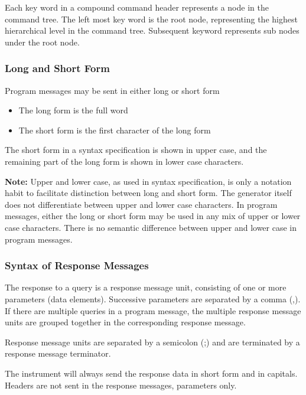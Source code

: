 Each key word in a compound command header represents a node in the command tree. The left most key word is the root node, representing the highest hierarchical level in the command tree. Subsequent keyword represents sub nodes under the root node.

\subsubsection{Long and Short Form}

Program messages may be sent in either long or short form
\begin{itemize}
\item The long form is the full word
\item The short form is the first character of the long form
\end{itemize}

The short form in a syntax specification is shown in upper case, and the remaining part of the long form is shown in lower case characters.

\textbf{Note:} Upper and lower case, as used in syntax specification, is only a notation habit to facilitate distinction between long and short form. The generator itself does not differentiate between upper and lower case characters. In program messages, either the long or short form may be used in any mix of upper or lower case characters. There is no semantic difference between upper and lower case in program messages.

\subsubsection{Syntax of Response Messages}
The response to a query is a response message unit, consisting of one or more parameters (data elements). Successive parameters are separated by a comma (,). If there are multiple queries in a program message, the multiple response message units are grouped together in the corresponding response message. 

Response message units are separated by a semicolon (;) and are terminated by a response message terminator. 

The instrument will always send the response data in short form and in capitals. Headers are not sent in the response messages, parameters only.

